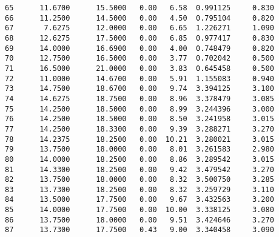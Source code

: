 \documentclass[11pt]{article}
\begin{document}
\begin{Verbatim}[commandchars=\\\{\}]
65      11.6700      15.5000   0.00   6.58  0.991125     0.830   
66      11.2500      14.5000   0.00   4.50  0.795104     0.820   
67       7.6275      12.0000   0.00   6.65  1.226271     1.090   
68      12.6275      17.5000   0.00   6.85  0.977417     0.830   
69      14.0000      16.6900   0.00   4.00  0.748479     0.820   
70      12.7500      16.5000   0.00   3.77  0.702042     0.500   
71      16.5000      21.0000   0.00   3.83  0.645458     0.500   
72      11.0000      14.6700   0.00   5.91  1.155083     0.940   
73      14.7500      18.6700   0.00   9.74  3.394125     3.100   
74      14.6275      18.7500   0.00   8.96  3.378479     3.085   
75      14.2500      18.5000   0.00   8.99  3.244396     3.000   
76      14.2500      18.5000   0.00   8.50  3.241958     3.015   
77      14.2500      18.3300   0.00   9.39  3.288271     3.270   
78      14.2375      18.2500   0.00  10.21  3.280021     3.015   
79      13.7500      18.0000   0.00   8.01  3.261583     2.980   
80      14.0000      18.2500   0.00   8.86  3.289542     3.015   
81      14.3300      18.2500   0.00   9.42  3.479542     3.270   
82      13.7500      18.0000   0.00   8.32  3.500750     3.285   
83      13.7300      18.2500   0.00   8.32  3.259729     3.110   
84      13.5000      17.7500   0.00   9.67  3.432563     3.200   
85      14.0000      17.7500   0.00  10.00  3.338125     3.080   
86      13.7500      18.0000   0.00   9.51  3.424646     3.270   
87      13.7300      17.7500   0.43   9.00  3.340458     3.090   


\end{Verbatim}
\end{document}
